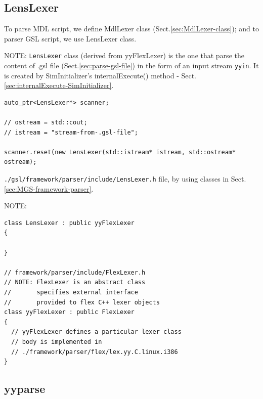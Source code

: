 \subsection{LensLexer}
\label{sec:LensLexer}

To parse MDL script, we define MdlLexer class (Sect.\ref{sec:MdlLexer-class});
and to parser GSL script, we use LensLexer class.


NOTE: \verb!LensLexer! class (derived from yyFlexLexer) is the one that parse
the content of .gsl file (Sect.\ref{sec:parse-gsl-file})
in the form of an input stream \verb!yyin!. It is created by SimInitializer's
internalExecute() method - Sect.\ref{sec:internalExecute-SimInitializer}.

\begin{verbatim}
auto_ptr<LensLexer*> scanner;

// ostream = std::cout;
// istream = "stream-from-.gsl-file";

scanner.reset(new LensLexer(std::istream* istream, std::ostream* ostream);
\end{verbatim}

\verb!./gsl/framework/parser/include/LensLexer.h! file, by 
using classes in Sect.\ref{sec:MGS-framework-parser}.



NOTE:
{\small
\begin{verbatim}
class LensLexer : public yyFlexLexer        
{

}

// framework/parser/include/FlexLexer.h
// NOTE: FlexLexer is an abstract class
//       specifies external interface
//       provided to flex C++ lexer objects
class yyFlexLexer : public FlexLexer                                                                          
{                                  
  // yyFlexLexer defines a particular lexer class
  // body is implemented in 
  // ./framework/parser/flex/lex.yy.C.linux.i386
}
\end{verbatim}
}
% 

\subsection{yyparse}
\label{sec:yyparse}

